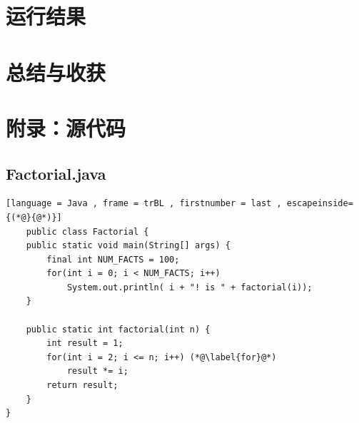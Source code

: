 \documentclass[UTF8]{ctexart}
\begin{document}
\section{运行结果}
\section{总结与收获}
\newpage
\appendix
\section{附录：源代码}
\subsection{Factorial.java}
\begin{lstlisting}[language = Java , frame = trBL , firstnumber = last , escapeinside={(*@}{@*)}]
    public class Factorial {
    public static void main(String[] args) {   
        final int NUM_FACTS = 100;
        for(int i = 0; i < NUM_FACTS; i++)
            System.out.println( i + "! is " + factorial(i));
    }

    public static int factorial(int n) {
        int result = 1;
        for(int i = 2; i <= n; i++) (*@\label{for}@*)
            result *= i;
        return result;
    }
}
\end{lstlisting}
\end{document}
